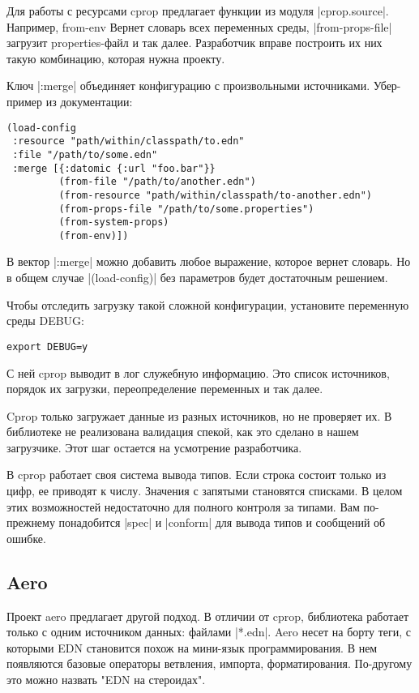 Для работы с ресурсами cprop предлагает функции из модуля
\spverb|cprop.source|. Например, from-env Вернет словарь всех переменных среды,
\spverb|from-props-file| загрузит properties-файл и так далее. Разработчик вправе
построить их них такую комбинацию, которая нужна проекту.

Ключ \spverb|:merge| объединяет конфигурацию с произвольными источниками. Убер-пример
из документации:

\begin{verbatim}
(load-config
 :resource "path/within/classpath/to.edn"
 :file "/path/to/some.edn"
 :merge [{:datomic {:url "foo.bar"}}
         (from-file "/path/to/another.edn")
         (from-resource "path/within/classpath/to-another.edn")
         (from-props-file "/path/to/some.properties")
         (from-system-props)
         (from-env)])
\end{verbatim}

В вектор \spverb|:merge| можно добавить любое выражение, которое вернет словарь. Но в
общем случае \spverb|(load-config)| без параметров будет достаточным решением.

Чтобы отследить загрузку такой сложной конфигурации, установите переменную среды
DEBUG:

\begin{verbatim}
export DEBUG=y
\end{verbatim}

С ней cprop выводит в лог служебную информацию. Это список источников, порядок
их загрузки, переопределение переменных и так далее.

Cprop только загружает данные из разных источников, но не проверяет их. В
библиотеке не реализована валидация спекой, как это сделано в нашем
загрузчике. Этот шаг остается на усмотрение разработчика.

В cprop работает своя система вывода типов. Если строка состоит только из цифр,
ее приводят к числу. Значения с запятыми становятся списками. В целом этих
возможностей недостаточно для полного контроля за типами. Вам по-прежнему
понадобится \spverb|spec| и \spverb|conform| для вывода типов и сообщений об ошибке.

\subsection{Aero}

Проект aero предлагает другой подход. В отличии от cprop, библиотека работает
только с одним источником данных: файлами \spverb|*.edn|. Aero несет на борту теги, с
которыми EDN становится похож на мини-язык программирования. В нем появляются
базовые операторы ветвления, импорта, форматирования. По-другому это можно
назвать "EDN на стероидах".

